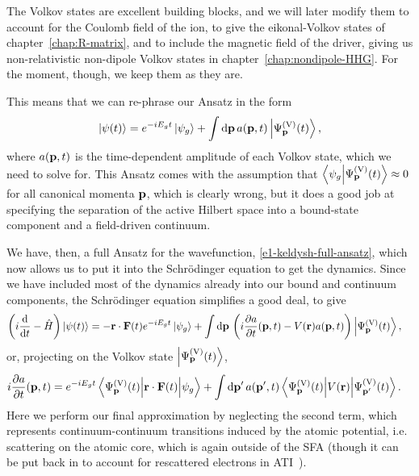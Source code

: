 The Volkov states are excellent building blocks, and we will later modify them to account for the Coulomb field of the ion, to give the eikonal-Volkov states of chapter~\ref{chap:R-matrix}, and to include the magnetic field of the driver, giving us non-relativistic non-dipole Volkov states in chapter~\ref{chap:nondipole-HHG}. For the moment, though, we keep them as they are.


This means that we can re-phrase our Ansatz in the form
\begin{equation}
\ket{\psi(t)} 
= 
e^{-iE_g t}\ket{\psi_g} 
+ \int \mathrm{d}\vb{p} \,a(\vb{p},t) \ket{\Psi^\mathrm{(V)}_{\vb{p}}(t)}, 
\label{e1-keldysh-full-ansatz}
\end{equation}
where $a(\vb{p},t)$ is the time-dependent amplitude of each Volkov state, which we need to solve for. This Ansatz comes with the assumption that $\braket{\psi_g}{\Psi^\mathrm{(V)}_{\vb{p}}(t)} \approx 0$ for all canonical momenta $\vb{p}$, which is clearly wrong, but it does a good job at specifying the separation of the active Hilbert space into a bound-state component and a field-driven continuum. 

We have, then, a full Ansatz for the wavefunction, \eqref{e1-keldysh-full-ansatz}, which now allows us to put it into the Schrödinger equation to get the dynamics. Since we have included most of the dynamics already into our bound and continuum components, the Schrödinger equation simplifies a good deal, to give
\begin{align}
\left(
i\frac{\mathrm{d}}{\mathrm{d} t}
-\hat H
\right)\ket{\psi(t)}
& =
-\vb{r}\cdot\vb{F}(t) e^{-iE_g t}\ket{\psi_g}
+ \int \mathrm{d}\vb{p} \,
\left( 
i\frac{\partial a}{\partial t}(\vb{p},t) 
-V(\vb{r})a(\vb{p},t)
\right)
\ket{\Psi^\mathrm{(V)}_{\vb{p}}(t)}
,
\end{align} 
or, projecting on the Volkov state $\ket{\Psi^\mathrm{(V)}_{\vb{p}}(t)}$,
\begin{align}
i\frac{\partial a}{\partial t}(\vbp,t)
& =
e^{-iE_g t}\matrixel{\Psi_{\vbp}^\mathrm{(V)}(t)}{\vbr\cdot\vbf(t)}{\psi_g}
+\int \d\vbp' \,
a(\vbp',t)
\matrixel{\Psi_{\vbp}^\mathrm{(V)}(t)}{V(\vbr)}{\Psi_{\vbp'}^\mathrm{(V)}(t)}
.
\end{align}
Here we perform our final approximation by neglecting the second term, which represents continuum-continuum transitions induced by the atomic potential, i.e. scattering on the atomic core, which is again outside of the SFA (though it can be put back in to account for rescattered electrons in ATI~\cite{milosevic_ISFA-standard_2007}).

